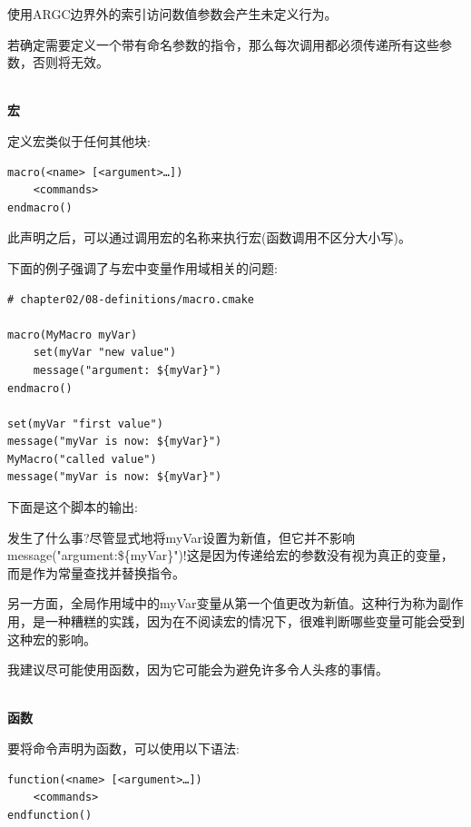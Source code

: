 使用ARGC边界外的索引访问数值参数会产生未定义行为。

若确定需要定义一个带有命名参数的指令，那么每次调用都必须传递所有这些参数，否则将无效。

\hspace*{\fill} \\ %
\noindent
\textbf{宏}

定义宏类似于任何其他块:

\begin{lstlisting}[style=styleCMake]
macro(<name> [<argument>…])
	<commands>
endmacro()
\end{lstlisting}

此声明之后，可以通过调用宏的名称来执行宏(函数调用不区分大小写)。

下面的例子强调了与宏中变量作用域相关的问题:

\begin{lstlisting}[style=styleCMake]
# chapter02/08-definitions/macro.cmake

macro(MyMacro myVar)
	set(myVar "new value")
	message("argument: ${myVar}")
endmacro()

set(myVar "first value")
message("myVar is now: ${myVar}")
MyMacro("called value")
message("myVar is now: ${myVar}")
\end{lstlisting}

下面是这个脚本的输出:


发生了什么事?尽管显式地将myVar设置为新值，但它并不影响message("argument:\$\{myVar\}")!这是因为传递给宏的参数没有视为真正的变量，而是作为常量查找并替换指令。

另一方面，全局作用域中的myVar变量从第一个值更改为新值。这种行为称为副作用，是一种糟糕的实践，因为在不阅读宏的情况下，很难判断哪些变量可能会受到这种宏的影响。

我建议尽可能使用函数，因为它可能会为避免许多令人头疼的事情。

\hspace*{\fill} \\ %
\noindent
\textbf{函数}

要将命令声明为函数，可以使用以下语法:

\begin{lstlisting}[style=styleCMake]
function(<name> [<argument>…])
	<commands>
endfunction()
\end{lstlisting}

